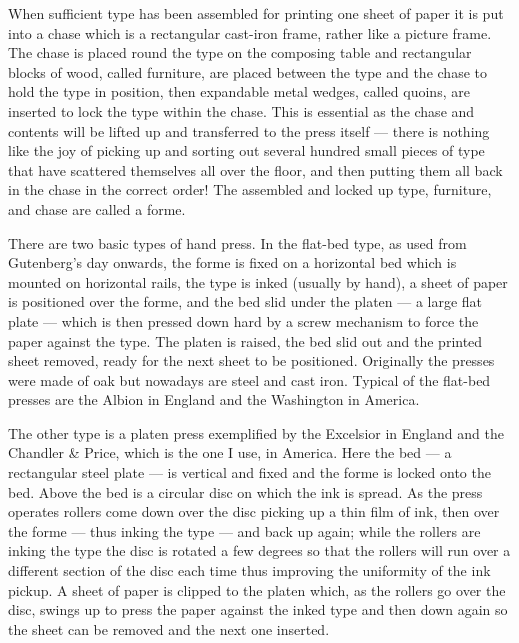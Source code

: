 \documentclass[10pt,letterpaper,extrafontsizes]{memoir}
\newcommand{\PWnote}[2]{}
\begin{document}
\enlargethispage{1em}

    When sufficient type has been assembled for printing one sheet of paper
it is put into a chase which is a rectangular cast-iron frame, 
rather like a picture frame. The chase is placed round the type
on the composing table and rectangular
blocks of wood, called furniture, are placed between the type and the chase
to hold the type in position, then expandable metal wedges, called 
quoins,
are inserted to lock the type within the chase. This is essential as the
chase and contents will be lifted up and transferred to the press itself ---
there is nothing like the joy of picking up and sorting out several hundred
small pieces of type that have scattered themselves all over the floor, and 
then putting them all back in the chase in the correct order! The assembled
and locked up type, furniture, and chase are called a forme.




\PWnote{2009/03/29}{Revised description of composing type and added paras 
        about kinds of hand presses}
    There are two basic types of hand press. In the 
flat-bed type, as 
used from Gutenberg's day onwards, the forme is fixed on a horizontal bed
which is mounted on horizontal rails, the type is inked (usually by hand), 
a sheet of paper is positioned over the forme, and the bed
slid under the platen --- a large flat plate --- which is then pressed
down hard by a screw mechanism to force the paper against the type. The platen 
is raised, the bed slid out and the printed sheet removed, ready for the next
sheet to be positioned. Originally the presses were made of oak but
nowadays are steel and cast iron. Typical of
the flat-bed presses are the  Albion in England 
and the Washington in America.

    The other type is a platen press 
exemplified by the Excelsior in England 
and the Chandler \& Price, which 
is the one I use, in America. Here the bed --- a rectangular steel plate ---
is vertical and fixed and the forme is locked onto the bed. Above the bed
is a circular disc on which the ink is spread. As the press operates rollers
come down over the disc picking up a thin film of ink, 
then over the forme --- thus inking the type ---
and back up again; while the rollers are inking the type the disc is
rotated a few degrees so that the rollers will run over a different section 
of the disc each time thus improving the uniformity of the ink pickup. 
A sheet of paper is clipped to the platen which, as the 
rollers go over the disc, swings up to press the paper against the inked type
and then down again so the sheet can be removed and the next one inserted.
\end{document}

